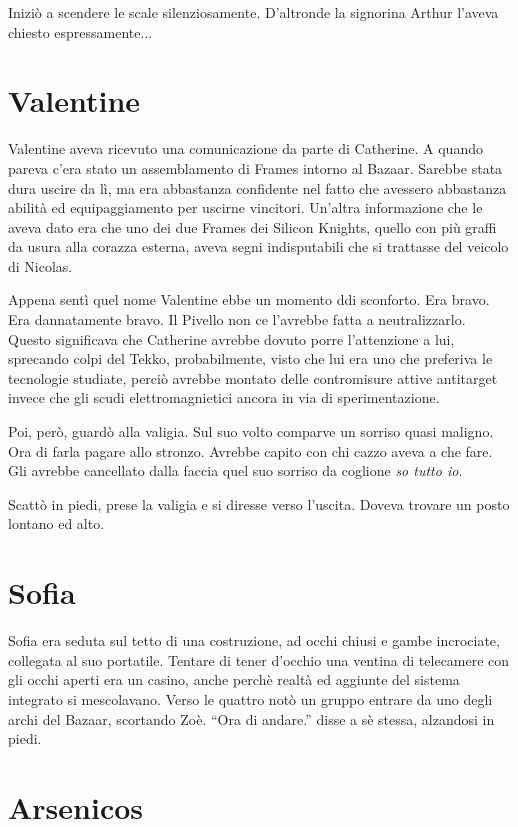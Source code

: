     Iniziò a scendere le scale silenziosamente. D'altronde la signorina Arthur l'aveva chiesto espressamente...

  \section*{Valentine}

    Valentine aveva ricevuto una comunicazione da parte di Catherine. A quando pareva c'era stato un assemblamento di
    Frames intorno al Bazaar. Sarebbe stata dura uscire da lì, ma era abbastanza confidente nel fatto che avessero
    abbastanza abilità ed equipaggiamento per uscirne vincitori. Un'altra informazione che le aveva dato era che uno dei
    due Frames dei Silicon Knights, quello con più graffi da usura alla corazza esterna, aveva segni indisputabili che
    si trattasse del veicolo di Nicolas.

    Appena sentì quel nome Valentine ebbe un momento ddi sconforto. Era bravo. Era dannatamente bravo. Il Pivello non ce
    l'avrebbe fatta a neutralizzarlo. Questo significava che Catherine avrebbe dovuto porre l'attenzione a lui,
    sprecando colpi del Tekko, probabilmente, visto che lui era uno che preferiva le tecnologie studiate, perciò avrebbe
    montato delle contromisure attive antitarget invece che gli scudi elettromagnietici ancora in via di
    sperimentazione.

    Poi, però, guardò alla valigia. Sul suo volto comparve un sorriso quasi maligno. Ora di farla pagare allo stronzo.
    Avrebbe capito con chi cazzo aveva a che fare. Gli avrebbe cancellato dalla faccia quel suo sorriso da coglione
    \emph{so tutto io}.

    Scattò in piedi, prese la valigia e si diresse verso l'uscita. Doveva trovare un posto lontano ed alto.

  \section*{Sofia}

    Sofia era seduta sul tetto di una costruzione, ad occhi chiusi e gambe incrociate, collegata al suo portatile. Tentare di tener
    d'occhio una ventina di telecamere con gli occhi aperti era un casino, anche perchè realtà ed aggiunte del sistema
    integrato si mescolavano. Verso le quattro notò un gruppo entrare da uno degli archi del Bazaar, scortando Zoè.
    ``Ora di andare.'' disse a sè stessa, alzandosi in piedi.

  \section*{Arsenicos}

